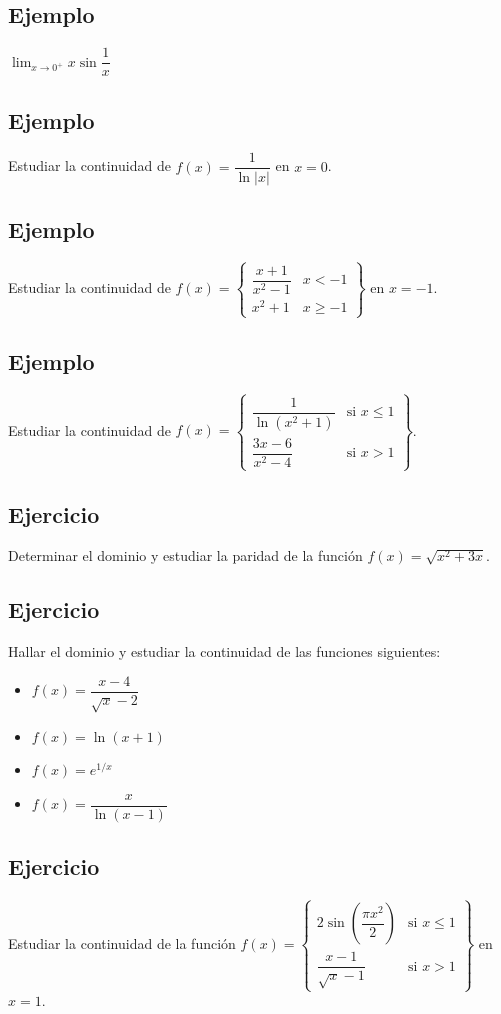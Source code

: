 \documentclass[10pt, a4paper]{article}
\begin{document}
\subsection{Ejemplo}
\label{sec:org6e0f581}
\(\displaystyle\lim_{ {x} \rightarrow {0^+} } {x\sin\dfrac{1}{x}}\)
\subsection{Ejemplo}
\label{sec:org9338645}
Estudiar la continuidad de \(f(x) = \dfrac{1}{\ln |x|}\) en \(x=0\).
\subsection{Ejemplo}
\label{sec:org076d321}
Estudiar la continuidad de \(f(x) = \left\{ \begin{array}{ll}\dfrac{x+1}{x^2-1} & x<-1 \\ x^2+1 & x \geq -1 \end{array} \right\}\) en \(x=-1\).
\subsection{Ejemplo}
\label{sec:orgb6df285}
Estudiar la continuidad de \(f(x)=\left\{\begin{array}{ll}\dfrac{1}{\ln\left(x^2+1\right)} & \text{si }x\leq1 \\ \dfrac{3x-6}{x^2-4} & \text{si }x>1 \end{array}\right\}\).
\subsection{Ejercicio}
\label{sec:orgc5c7595}
Determinar el dominio y estudiar la paridad de la función \(f(x) = \sqrt{x^{2} + 3x}\).
\subsection{Ejercicio}
\label{sec:orged12088}
Hallar el dominio y estudiar la continuidad de las funciones siguientes:
\begin{itemize}
\item \(f(x)=\dfrac{x-4}{\sqrt{x}-2}\)
\item \(f(x)=\ln(x+1)\)
\item \(f(x)=e^{1/x}\)
\item \(f(x)=\dfrac{x}{\ln(x-1)}\)
\end{itemize}
\subsection{Ejercicio}
\label{sec:orgfeb32b0}
Estudiar la continuidad de la función \(f(x) = \left\{ \begin{array}{ll} 2 \sin \left(\dfrac{\pi x^{2}}{2}\right) & \text{si } x \leq 1 \\ \dfrac{x - 1}{\sqrt{x} - 1} & \text{si } x > 1 \end{array} \right\}\) en \(x=1\).
\end{document}

